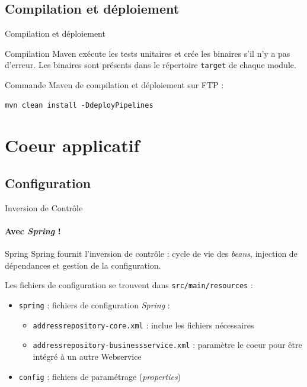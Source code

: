 \documentclass[compact]{beamer}%
\begin{document}
\subsection{Compilation et déploiement}

\begin{frame}[fragile]{Compilation et déploiement}

	\begin{block}{Compilation}
	Maven exécute les tests unitaires et crée les binaires s'il n'y a pas d'erreur. Les binaires sont présents dans le répertoire \texttt{target} de chaque module.
	\end{block}
	
	\pause
	Commande Maven de compilation et déploiement sur FTP :
	\begin{lstlisting}
mvn clean install -DdeployPipelines
	\end{lstlisting}

\end{frame}


\section{Coeur applicatif}

\subsection{Configuration}

\begin{frame}{Inversion de Contrôle}
	\framesubtitle{Avec \emph{Spring} !}
	
	\begin{block}{Spring}
	Spring fournit l'inversion de contrôle : cycle de vie des \emph{beans}, injection de dépendances et gestion de la configuration.
	\end{block}
	
	\pause
	Les fichiers de configuration se trouvent dans \texttt{src/main/resources} :
	\begin{itemize}[<+->]
	\item \texttt{spring} : fichiers de configuration \emph{Spring} :
		\begin{itemize}[<+->]
		\item \texttt{addressrepository-core.xml} : inclue les fichiers nécessaires
		\item \texttt{addressrepository-businessservice.xml} : paramètre le coeur pour être intégré à un autre Webservice
		\end{itemize}
	\item \texttt{config} : fichiers de paramétrage (\emph{properties})
	\end{itemize}
	
\end{frame}
\end{document}
